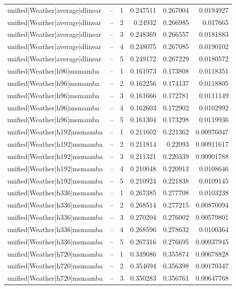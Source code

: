 \begin{longtable}{llrrrr}
unified|Weather|average|dlinear & -- & 1 & 0.247511 & 0.267004 & 0.0194927 \\
unified|Weather|average|dlinear & -- & 2 & 0.24932 & 0.266985 & 0.017665 \\
unified|Weather|average|dlinear & -- & 3 & 0.248369 & 0.266557 & 0.0181883 \\
unified|Weather|average|dlinear & -- & 4 & 0.248075 & 0.267085 & 0.0190102 \\
unified|Weather|average|dlinear & -- & 5 & 0.249172 & 0.267229 & 0.0180572 \\
unified|Weather|h96|msmamba & -- & 1 & 0.161973 & 0.173808 & 0.0118351 \\
unified|Weather|h96|msmamba & -- & 2 & 0.162256 & 0.174137 & 0.0118805 \\
unified|Weather|h96|msmamba & -- & 3 & 0.161666 & 0.172781 & 0.0111149 \\
unified|Weather|h96|msmamba & -- & 4 & 0.162603 & 0.172902 & 0.0102992 \\
unified|Weather|h96|msmamba & -- & 5 & 0.161304 & 0.173298 & 0.0119936 \\
unified|Weather|h192|msmamba & -- & 1 & 0.211602 & 0.221362 & 0.00976047 \\
unified|Weather|h192|msmamba & -- & 2 & 0.211814 & 0.22093 & 0.00911617 \\
unified|Weather|h192|msmamba & -- & 3 & 0.211321 & 0.220339 & 0.00901788 \\
unified|Weather|h192|msmamba & -- & 4 & 0.210048 & 0.220913 & 0.0108646 \\
unified|Weather|h192|msmamba & -- & 5 & 0.210924 & 0.221838 & 0.0109145 \\
unified|Weather|h336|msmamba & -- & 1 & 0.267385 & 0.277708 & 0.0103238 \\
unified|Weather|h336|msmamba & -- & 2 & 0.268514 & 0.277215 & 0.00870094 \\
unified|Weather|h336|msmamba & -- & 3 & 0.270204 & 0.276002 & 0.00579801 \\
unified|Weather|h336|msmamba & -- & 4 & 0.268596 & 0.278632 & 0.0100364 \\
unified|Weather|h336|msmamba & -- & 5 & 0.267316 & 0.276695 & 0.00937945 \\
unified|Weather|h720|msmamba & -- & 1 & 0.349086 & 0.355874 & 0.00678828 \\
unified|Weather|h720|msmamba & -- & 2 & 0.354694 & 0.356398 & 0.00170347 \\
unified|Weather|h720|msmamba & -- & 3 & 0.350283 & 0.356761 & 0.00647768 \\

\end{longtable}
